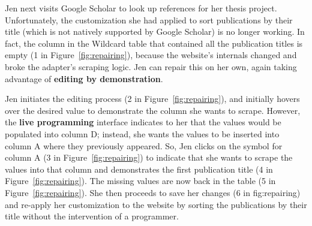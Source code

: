 \documentclass[sigconf,10pt]{acmart}
\begin{document}
Jen next visits Google Scholar to look up references for her thesis
project. Unfortunately, the customization she had applied to sort
publications by their title (which is not natively supported by Google
Scholar) is no longer working. In fact, the column in the Wildcard table
that contained all the publication titles is empty (1 in
Figure~\ref{fig:repairing}), because the website's internals changed and
broke the adapter's scraping logic. Jen can repair this on her own,
again taking advantage of \textbf{editing by demonstration}.

Jen initiates the editing process (2 in Figure~\ref{fig:repairing}), and
initially hovers over the desired value to demonstrate the column she
wants to scrape. However, the \textbf{live programming} interface
indicates to her that the values would be populated into column D;
instead, she wants the values to be inserted into column A where they
previously appeared. So, Jen clicks on the symbol for column A (3 in
Figure~\ref{fig:repairing}) to indicate that she wants to scrape the
values into that column and demonstrates the first publication title (4
in Figure~\ref{fig:repairing}). The missing values are now back in the
table (5 in Figure~\ref{fig:repairing}). She then proceeds to save her
changes (6 in fig:repairing) and re-apply her customization to the
website by sorting the publications by their title without the
intervention of a programmer.
\end{document}
